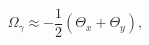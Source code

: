 \begin{equation}
\Omega_\gamma \approx -\frac{1}{2}(\Theta_x +\Theta_y),
\label{omap}
\end{equation}

